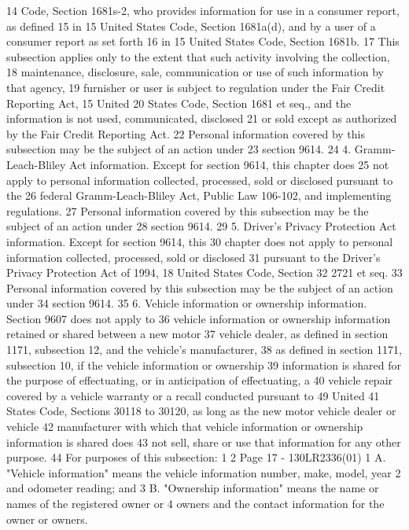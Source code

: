 14 Code, Section 1681s-2, who provides information for use in a consumer report, as defined
15 in 15 United States Code, Section 1681a(d), and by a user of a consumer report as set forth
16 in 15 United States Code, Section 1681b.
17 This subsection applies only to the extent that such activity involving the collection,
18 maintenance, disclosure, sale, communication or use of such information by that agency,
19 furnisher or user is subject to regulation under the Fair Credit Reporting Act, 15 United
20 States Code, Section 1681 et seq., and the information is not used, communicated, disclosed
21 or sold except as authorized by the Fair Credit Reporting Act.
22 Personal information covered by this subsection may be the subject of an action under
23 section 9614.
24 4. Gramm-Leach-Bliley Act information. Except for section 9614, this chapter does
25 not apply to personal information collected, processed, sold or disclosed pursuant to the
26 federal Gramm-Leach-Bliley Act, Public Law 106-102, and implementing regulations.
27 Personal information covered by this subsection may be the subject of an action under
28 section 9614.
29 5. Driver's Privacy Protection Act information. Except for section 9614, this
30 chapter does not apply to personal information collected, processed, sold or disclosed
31 pursuant to the Driver's Privacy Protection Act of 1994, 18 United States Code, Section
32 2721 et seq.
33 Personal information covered by this subsection may be the subject of an action under
34 section 9614.
35 6. Vehicle information or ownership information. Section 9607 does not apply to
36 vehicle information or ownership information retained or shared between a new motor
37 vehicle dealer, as defined in section 1171, subsection 12, and the vehicle's manufacturer,
38 as defined in section 1171, subsection 10, if the vehicle information or ownership
39 information is shared for the purpose of effectuating, or in anticipation of effectuating, a
40 vehicle repair covered by a vehicle warranty or a recall conducted pursuant to 49 United
41 States Code, Sections 30118 to 30120, as long as the new motor vehicle dealer or vehicle
42 manufacturer with which that vehicle information or ownership information is shared does
43 not sell, share or use that information for any other purpose.
44 For purposes of this subsection:
1
2
Page 17 - 130LR2336(01)
1 A. "Vehicle information" means the vehicle information number, make, model, year
2 and odometer reading; and
3 B. "Ownership information" means the name or names of the registered owner or
4 owners and the contact information for the owner or owners.
